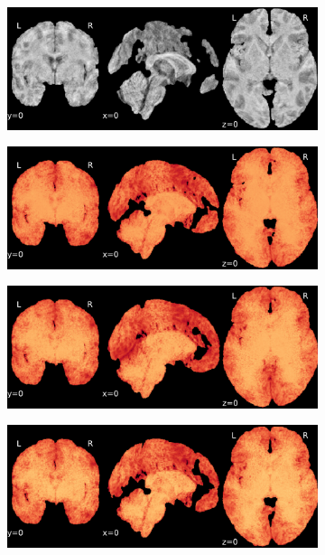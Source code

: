 \documentclass{article}
\begin{document}
\begin{appendices}
\begin{landscape}
\begin{figure}
            \begin{subfigure}[t]{0.2\paperheight}
                \centering
                \includegraphics[width=\textwidth]{figures/sig/0mm/ieee_ds000256_sub-CTS210.pdf}
            \end{subfigure}
            \begin{subfigure}[t]{0.2\paperheight}
                \centering
                \includegraphics[width=\textwidth]{figures/sig/0mm/rr_ds000256_sub-CTS210_sig.pdf}
            \end{subfigure}
            \begin{subfigure}[t]{0.2\paperheight}
                \centering
                \includegraphics[width=\textwidth]{figures/sig/0mm/rs_ds000256_sub-CTS210_sig.pdf}
            \end{subfigure}
            \begin{subfigure}[t]{0.2\paperheight}
                \centering
                \includegraphics[width=\textwidth]{figures/sig/0mm/rr.rs_ds000256_sub-CTS210_sig.pdf}

\end{subfigure}
\end{figure}
\end{landscape}
\end{appendices}
\end{document}
